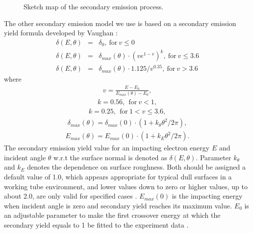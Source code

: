 \documentclass[aps,prstab,superscriptaddress,showpacs]{revtex4-1}
\begin{document}
\begin{figure}
    \centering
    
    \caption{Sketch map of the secondary emission process.}
    \label{incident electrons}
\end{figure}

The other secondary emission model we use is based on a secondary emission yield formula developed by Vaughan \cite{Vaughan, VaughanRv, FS}:
\begin{subequations}
\label{Vaughanall}
\begin{eqnarray}
\delta(E,\theta)&=&\delta_0,\ \text{for}\ v \le 0 \label{eq:VaughanA} 
\\
    \delta(E,\theta)&=&\delta_{max}(\theta)\cdot (v e^{1-v})^k,\ \text{for}\ v \le 3.6 \label{eq:VaughanB} 
\\
\delta(E,\theta)&=&\delta_{max}(\theta)\cdot 1.125/v^{0.35},\ \text{for}\ v > 3.6 \label{eq:VaughanC} 
\end{eqnarray}
\end{subequations}
where 
\begin{eqnarray*}
v=\frac{\displaystyle E-E_0}{\displaystyle E_{max}(\theta)-E_0},
\end{eqnarray*}
\begin{eqnarray*}
k=0.56,\ \ \text{for}\ v<1,
\end{eqnarray*}
\begin{eqnarray*}
k=0.25,\ \ \text{for}\ 1<v\le{3.6},
\end{eqnarray*}
\begin{eqnarray*}
\delta_{max}(\theta)=\delta_{max}(0)\cdot (1+k_{\theta}\theta^2/2\pi),
\end{eqnarray*}
\begin{eqnarray*}
E_{max}(\theta)=E_{max}(0)\cdot (1+k_E\theta^2/2\pi).
\end{eqnarray*}
The secondary emission yield value for an impacting electron energy $E$ and incident angle $\theta$ w.r.t the surface normal is denoted as $\delta(E,\theta)$. Parameter $k_{\theta}$ and $k_E$ denotes the dependence on surface roughness. Both
should be assigned a default value of 1.0, which appears appropriate for typical dull surfaces in a working tube environment, and lower values down to zero or higher values, up to about 2.0, are only valid for specified cases \cite{Vaughan}. $E_{max}(0)$ is the impacting energy when incident angle is zero and secondary yield reaches its maximum value. $E_0$ is an adjustable parameter to make the first crossover energy at which the secondary yield equals to 1 be fitted to the experiment data \cite{FS}.
 
\end{document}
